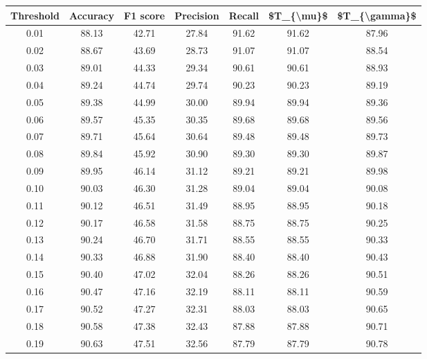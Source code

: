 \begin{tabular}{|c|c|c|c|c|c|c|}
\hline
 Threshold &  Accuracy &  F1 score &  Precision &  Recall &  \$T\_\{\textbackslash mu\}\$ &  \$T\_\{\textbackslash gamma\}\$ \\
\hline
      0.01 &     88.13 &     42.71 &      27.84 &   91.62 &      91.62 &         87.96 \\
      0.02 &     88.67 &     43.69 &      28.73 &   91.07 &      91.07 &         88.54 \\
      0.03 &     89.01 &     44.33 &      29.34 &   90.61 &      90.61 &         88.93 \\
      0.04 &     89.24 &     44.74 &      29.74 &   90.23 &      90.23 &         89.19 \\
      0.05 &     89.38 &     44.99 &      30.00 &   89.94 &      89.94 &         89.36 \\
      0.06 &     89.57 &     45.35 &      30.35 &   89.68 &      89.68 &         89.56 \\
      0.07 &     89.71 &     45.64 &      30.64 &   89.48 &      89.48 &         89.73 \\
      0.08 &     89.84 &     45.92 &      30.90 &   89.30 &      89.30 &         89.87 \\
      0.09 &     89.95 &     46.14 &      31.12 &   89.21 &      89.21 &         89.98 \\
      0.10 &     90.03 &     46.30 &      31.28 &   89.04 &      89.04 &         90.08 \\
      0.11 &     90.12 &     46.51 &      31.49 &   88.95 &      88.95 &         90.18 \\
      0.12 &     90.17 &     46.58 &      31.58 &   88.75 &      88.75 &         90.25 \\
      0.13 &     90.24 &     46.70 &      31.71 &   88.55 &      88.55 &         90.33 \\
      0.14 &     90.33 &     46.88 &      31.90 &   88.40 &      88.40 &         90.43 \\
      0.15 &     90.40 &     47.02 &      32.04 &   88.26 &      88.26 &         90.51 \\
      0.16 &     90.47 &     47.16 &      32.19 &   88.11 &      88.11 &         90.59 \\
      0.17 &     90.52 &     47.27 &      32.31 &   88.03 &      88.03 &         90.65 \\
      0.18 &     90.58 &     47.38 &      32.43 &   87.88 &      87.88 &         90.71 \\
      0.19 &     90.63 &     47.51 &      32.56 &   87.79 &      87.79 &         90.78 \\

\end{tabular}
